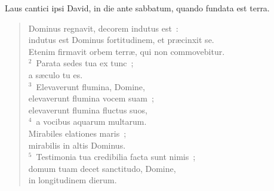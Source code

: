 \bchapter
\lettrine[lines=3,image=true,loversize=0.05,lraise=-0.03]{L}{}aus cantici ipsi David, in die ante sabbatum, quando fundata est terra. \begin{flushleft}\begin{verse}\vspace{6pt}Dominus regnavit, decorem indutus est~:\\ indutus est Dominus fortitudinem, et pr\ae cinxit se.\\ Etenim firmavit orbem terr\ae , qui non commovebitur.\\
${}^{2}$~Parata sedes tua ex tunc~;\\ a s\ae culo tu es.\\
${}^{3}$~Elevaverunt flumina, Domine,\\ elevaverunt flumina vocem suam~;\\ elevaverunt flumina fluctus suos,\\
${}^{4}$~a vocibus aquarum multarum.\\ Mirabiles elationes maris~;\\ mirabilis in altis Dominus.\\
${}^{5}$~Testimonia tua credibilia facta sunt nimis~;\\ domum tuam decet sanctitudo, Domine,\\ in longitudinem dierum.\end{verse}\end{flushleft}




